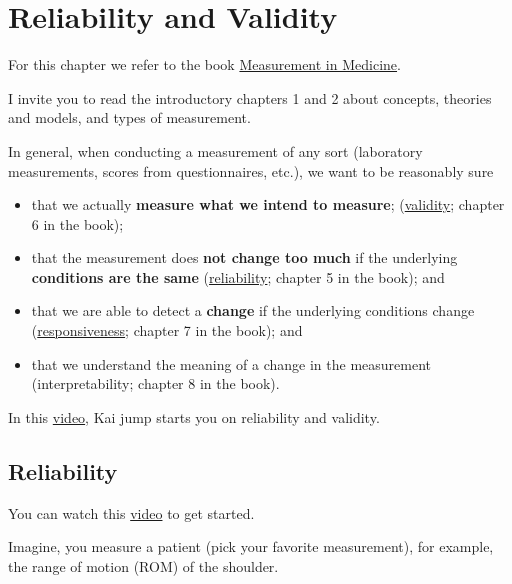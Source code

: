 \documentclass[
]{article}
\author{}
\date{\vspace{-2.5em}}
\providecommand{\tightlist}{%
  \setlength{\itemsep}{0pt}\setlength{\parskip}{0pt}}
\begin{document}
{
\setcounter{tocdepth}{2}
\tableofcontents
}
\section{Reliability and Validity}\label{reliability-and-validity}

For this chapter we refer to the book
\href{https://www.cambridge.org/core/books/measurement-in-medicine/8BD913A1DA0ECCBA951AC4C1F719BCC5}{Measurement in Medicine}.

I invite you to read the introductory chapters 1 and 2 about concepts,
theories and models, and types of measurement.

In general, when conducting a measurement of any sort
(laboratory measurements, scores from questionnaires, etc.),
we want to be reasonably sure

\begin{itemize}
\tightlist
\item
  that we actually \textbf{measure what we intend to measure};
  (\href{https://en.wikipedia.org/wiki/Validity_(statistics)}{validity};
  chapter 6 in the book);
\item
  that the measurement does \textbf{not change too much} if the
  underlying \textbf{conditions are the same}
  (\href{https://en.wikipedia.org/wiki/Reliability_(statistics)}{reliability};
  chapter 5 in the book); and
\item
  that we are able to detect a \textbf{change} if the underlying conditions change
  (\href{https://tinyurl.com/3vdcxy49}{responsiveness}; chapter 7 in the book); and
\item
  that we understand the meaning of a change in the measurement
  (interpretability; chapter 8 in the book).
\end{itemize}

In this \href{https://www.youtube.com/watch?v=KuT2n1w0Ixc&ab_channel=Physiotutors}{video},
Kai jump starts you on reliability and validity.

\subsection{Reliability}\label{reliability}

You can watch this \href{https://www.youtube.com/watch?v=9HSoWaRpcys&ab_channel=Physiotutors}{video}
to get started.

Imagine, you measure a patient (pick your favorite measurement), for example,
the range of motion (ROM) of the shoulder.
\end{document}

